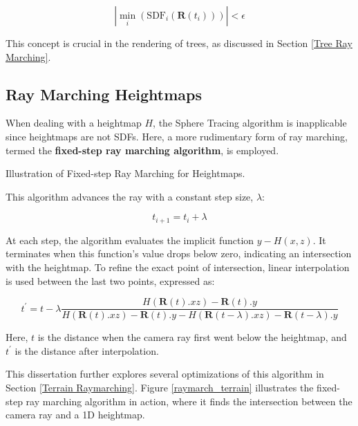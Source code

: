 \begin{equation}
|\min_{i}(\text{SDF}_i(\mathbf{R}(t_i)))| < \epsilon 
\end{equation}

This concept is crucial in the rendering of trees, as discussed in Section \ref{Tree Ray Marching}.



\subsection{Ray Marching Heightmaps}
\label{Raymarching Heightmaps}

When dealing with a heightmap $H$, the Sphere Tracing algorithm is inapplicable since heightmaps are not SDFs. Here, a more rudimentary form of ray marching, termed the \textbf{fixed-step ray marching algorithm}, is employed.

{Illustration of Fixed-step Ray Marching for Heightmaps. 
}{}



This algorithm advances the ray with a constant step size, $\lambda$:

\begin{equation}
    t_{i+1} = t_{i} + \lambda
\end{equation}

At each step, the algorithm evaluates the implicit function $y-H(x,z)$. It terminates when this function's value drops below zero, indicating an intersection with the heightmap. To refine the exact point of intersection, linear interpolation is used between the last two points, expressed as:

\begin{equation}
t^\prime = t - \lambda \frac{H(\mathbf{R}(t).xz) - \mathbf{R}(t).y}
    {H(\mathbf{R}(t).xz) - \mathbf{R}(t).y - H(\mathbf{R}(t - \lambda).xz) - \mathbf{R}(t - \lambda).y}
\end{equation}

Here, $t$ is the distance when the camera ray first went below the heightmap, and $t^\prime$ is the distance after interpolation.

This dissertation further explores several optimizations of this algorithm in Section \ref{Terrain Raymarching}. Figure \ref{raymarch_terrain} illustrates the fixed-step ray marching algorithm in action, where it finds the intersection between the camera ray and a 1D heightmap.




